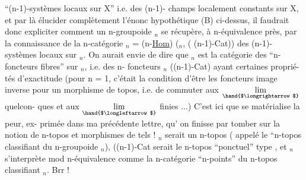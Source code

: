 

``(n-1)-systèmes locaux sur X'' i.e. des (n-1)- champs localement constants
sur X, et par là élucider complètement l'énonc hypothétique (B) ci-dessus,
il faudrait donc expliciter comment un n-groupoide $_n$ se récupère, à
n-équivalence près, par la connaissance de la n-catégorie
$_n$ = (n-\underline{Hom}) ($_n$, ( (n-1)-Cat)) des (n-1)- systèmes locaux sur $_n$. On
aurait envie de dire que $_n$ est la catégorie des ``n-foncteurs fibres'' sur
$_n$, i.e. des n- foncteurs $_n$ \hand{$\longrightarrow$}((n-1)-Cat) ayant certaines proprié-%
tés d'exactitude (pour n = 1, c'était la condition d'être les foncteurs
image inverse pour un morphisme de topos, i.e. de commuter aux $\underset{\hand{$\longrightarrow$}}{\mathrm{lim}}$ quelcon-%
ques et aux $\underset{\hand{$\longleftarrow$}}{\mathrm{lim}}$ finies ...) C'est ici que se matérialise la peur, ex-%
primée dans ma précédente lettre, qu' on finisse par tomber sur la notion
de n-topos et morphismes de tels ! $_n$ serait un n-topos\hand{,} ( appelé
le ``n-topos classifiant du n-groupoide $_n$), ((n-1)-Cat serait le
n-topos ``ponctuel'' type , et $_n$ s'interprète mod n-équivalence
comme la n-catégorie  ``n-points'' du n-topos classifiant $_n$. Brr !

